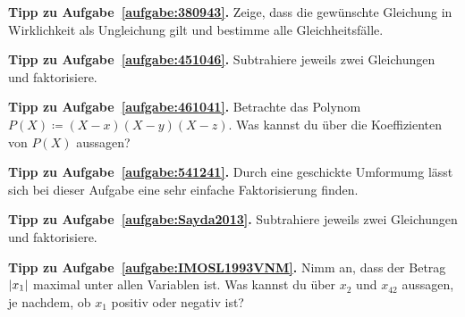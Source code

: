 \textbf{Tipp zu Aufgabe~\ref{aufgabe:380943}.} Zeige, dass die gewünschte Gleichung in Wirklichkeit als Ungleichung gilt und bestimme alle Gleichheitsfälle.

\textbf{Tipp zu Aufgabe~\ref{aufgabe:451046}.} Subtrahiere jeweils zwei Gleichungen und faktorisiere.

\textbf{Tipp zu Aufgabe~\ref{aufgabe:461041}.} Betrachte das Polynom $P(X)\coloneqq (X-x)(X-y)(X-z)$. Was kannst du über die Koeffizienten von $P(X)$ aussagen?

\textbf{Tipp zu Aufgabe~\ref{aufgabe:541241}.} Durch eine geschickte Umformumg lässt sich bei dieser Aufgabe eine sehr einfache Faktorisierung finden.

\textbf{Tipp zu Aufgabe~\ref{aufgabe:Sayda2013}.} Subtrahiere jeweils zwei Gleichungen und faktorisiere.

\textbf{Tipp zu Aufgabe~\ref{aufgabe:IMOSL1993VNM}.} Nimm an, dass der Betrag $\lvert x_1\rvert$ maximal unter allen Variablen ist. Was kannst du über $x_2$ und $x_{42}$ aussagen, je nachdem, ob $x_1$ positiv oder negativ ist?